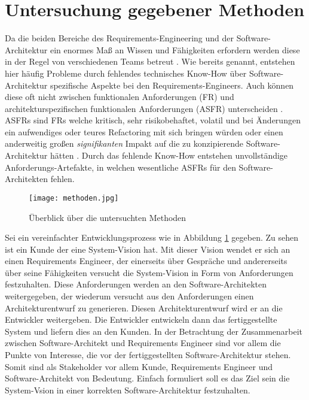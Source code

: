 \section{Untersuchung gegebener Methoden}

Da die beiden Bereiche des Requirements-Engineering und der Software-Architektur ein enormes Maß an Wissen und Fähigkeiten erfordern werden diese in der Regel von verschiedenen Teams betreut \cite{Ros02}. Wie bereits genannt, entstehen hier häufig Probleme durch fehlendes technisches Know-How über Software-Architektur spezifische Aspekte bei den Requirements-Engineers. Auch können diese oft nicht zwischen funktionalen Anforderungen (FR) und architekturspezifischen funktionalen Anforderungen (ASFR) unterscheiden \cite{Ros03}. ASFRs sind FRs welche kritisch, sehr risikobehaftet, volatil und bei Änderungen ein aufwendiges oder teures Refactoring mit sich bringen würden oder einen anderweitig großen \textit{signifikanten} Impakt auf die zu konzipierende Software-Architektur hätten \cite{Ros02}. Durch das fehlende Know-How entstehen unvollständige Anforderungs-Artefakte, in welchen wesentliche ASFRs für den Software-Architekten fehlen. \\

\begin{figure}[h]
	\centering
	\texttt{[image: methoden.jpg]} 
	\caption{Überblick über die untersuchten Methoden}\label{methoden}
\end{figure}

Sei ein vereinfachter Entwicklungsprozess wie in Abbildung \ref{methoden} gegeben. Zu sehen ist ein Kunde der eine System-Vision hat. Mit dieser Vision wendet er sich an einen Requirements Engineer, der einerseits über Gespräche und andererseits über seine Fähigkeiten versucht die System-Vision in Form von Anforderungen festzuhalten. Diese Anforderungen werden an den Software-Architekten weitergegeben, der wiederum versucht aus den Anforderungen einen Architekturentwurf zu generieren. Diesen Architekturentwurf wird er an die Entwickler weitergeben. Die Entwickler entwickeln dann das fertiggestellte System und liefern dies an den Kunden. In der Betrachtung der Zusammenarbeit zwischen Software-Architekt und Requirements Engineer sind vor allem die Punkte von Interesse, die vor der fertiggestellten Software-Architektur stehen. Somit sind als Stakeholder vor allem Kunde, Requirements Engineer und Software-Architekt von Bedeutung. Einfach formuliert soll es das Ziel sein die System-Vsion in einer korrekten Software-Architektur festzuhalten.\\

